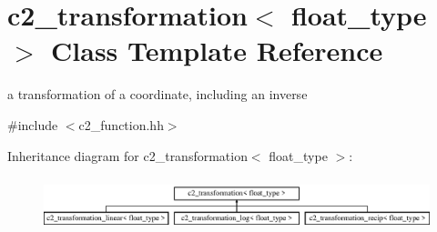 \hypertarget{classc2__transformation}{\section{c2\-\_\-transformation$<$ float\-\_\-type $>$ Class Template Reference}
\label{classc2__transformation}
}


a transformation of a coordinate, including an inverse  




{\ttfamily \#include $<$c2\-\_\-function.\-hh$>$}

Inheritance diagram for c2\-\_\-transformation$<$ float\-\_\-type $>$\-:\begin{figure}[H]
\begin{center}
\leavevmode
\includegraphics[height=1.562064cm]{classc2__transformation}
\end{center}
\end{figure}
